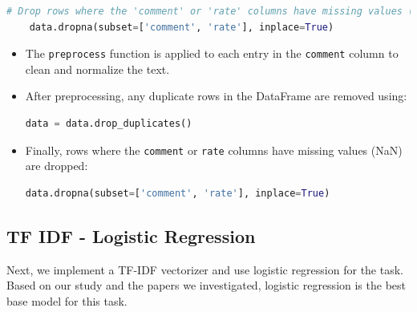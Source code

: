 \documentclass{solutionclass} %
\begin{document}
\begin{solution}
\begin{lstlisting}[language=Python]
    # Drop rows where the 'comment' or 'rate' columns have missing values (NaN)
    data.dropna(subset=['comment', 'rate'], inplace=True)
    \end{lstlisting}
    
    \begin{itemize}
        \item The \texttt{preprocess} function is applied to each entry in the \texttt{comment} column to clean and normalize the text.
        \item After preprocessing, any duplicate rows in the DataFrame are removed using:
        \begin{lstlisting}[language=Python]
        data = data.drop_duplicates()
        \end{lstlisting}
        \item Finally, rows where the \texttt{comment} or \texttt{rate} columns have missing values (NaN) are dropped:
        \begin{lstlisting}[language=Python]
        data.dropna(subset=['comment', 'rate'], inplace=True)
        \end{lstlisting}
    \end{itemize}
    
\end{solution}




\subsection*{TF IDF - Logistic Regression}

Next, we implement a TF-IDF vectorizer and use logistic regression for the task. Based on our study and the papers we investigated, logistic regression is the best base model for this task.
\end{document}
